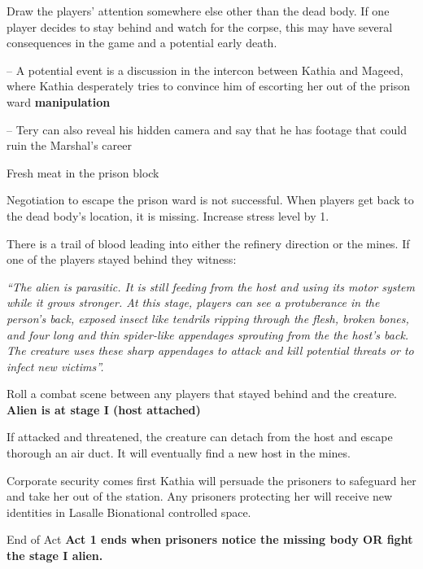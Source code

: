 \begin{rpg-commentbox}{}
    
    Draw the players' attention somewhere else other than the dead body. If one player decides to stay behind and watch for the corpse, this may have several consequences in the game and a potential early death.
    
    -- A potential event is a discussion in the intercon between Kathia and Mageed, where Kathia desperately tries to convince him of escorting her out of the prison ward \textbf{manipulation}
    
    -- Tery can also reveal his hidden camera and say that he has footage that could ruin the Marshal's career

\end{rpg-commentbox}

\newsect



\begin{rpg-commentbox}{Fresh meat in the prison block}
    
    Negotiation to escape the prison ward is not successful. When players get back to the dead body's location, it is missing. Increase stress level by 1.
    
    There is a trail of blood leading into either the refinery direction or the mines. If one of the players stayed behind they witness:
    
    \textit{
    ``The alien is parasitic. It is still feeding from the host and using its motor system while it grows stronger. At this stage, players can see a protuberance in the person's back, exposed insect like tendrils ripping through the flesh, broken bones, and four long and thin spider-like appendages sprouting from the the host's back. The creature uses these sharp appendages to attack and kill potential threats or to infect new victims''.
    } 

    \medskip
    
    
    Roll a combat scene between any players that stayed behind and the creature. \textbf{Alien is at stage I (host attached)}
    
    If attacked and threatened, the creature can detach from the host and escape thorough an air duct. It will eventually find a new host in the mines.
    
    

\end{rpg-commentbox}    


\begin{rpg-commentbox}{Corporate security comes first}
    Kathia will persuade the prisoners to safeguard her and take her out of the station. Any prisoners protecting her will receive new identities in Lasalle Bionational controlled space.
\end{rpg-commentbox}
    


\begin{rpg-commentbox}{End of Act}
    \textbf{Act 1 ends when prisoners notice the missing body OR fight the stage I alien.}
 \end{rpg-commentbox}